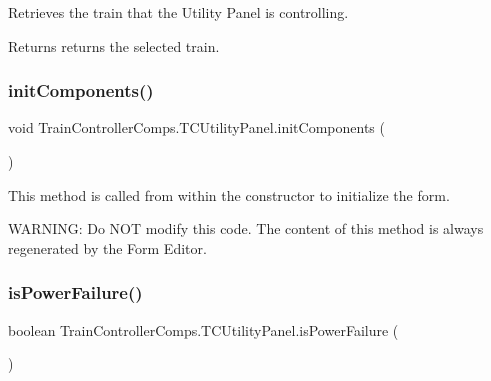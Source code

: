 Retrieves the train that the Utility Panel is controlling. 

\begin{DoxyReturn}{Returns}
returns the selected train. 
\end{DoxyReturn}
\mbox{\label{classTrainControllerComps_1_1TCUtilityPanel_aec618c0214d08262c146d7f941d0ce82}} 
\subsubsection{\texorpdfstring{init\+Components()}{initComponents()}}
{\footnotesize\ttfamily void Train\+Controller\+Comps.\+T\+C\+Utility\+Panel.\+init\+Components (\begin{DoxyParamCaption}{ }\end{DoxyParamCaption})\hspace{0.3cm}{\ttfamily [private]}}



This method is called from within the constructor to initialize the form. 

W\+A\+R\+N\+I\+NG\+: Do N\+OT modify this code. The content of this method is always regenerated by the Form Editor. \mbox{\label{classTrainControllerComps_1_1TCUtilityPanel_acaca09d08ce4e54af81dc86ab2c768d5}} 
\subsubsection{\texorpdfstring{is\+Power\+Failure()}{isPowerFailure()}}
{\footnotesize\ttfamily boolean Train\+Controller\+Comps.\+T\+C\+Utility\+Panel.\+is\+Power\+Failure (\begin{DoxyParamCaption}{ }\end{DoxyParamCaption})\hspace{0.3cm}{\ttfamily [private]}}



